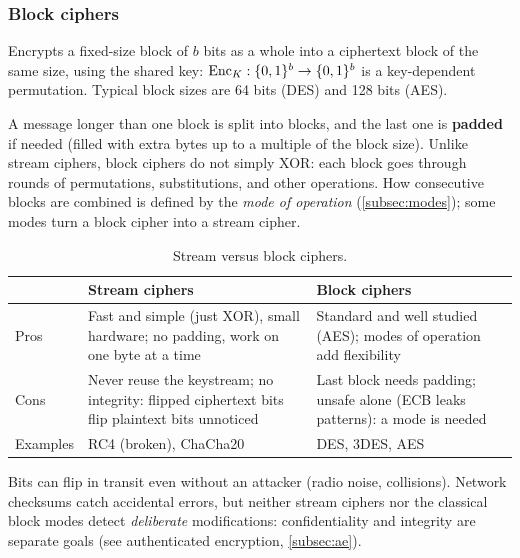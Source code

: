 \subsubsection{Block ciphers}

\begin{definition}
Encrypts a fixed-size block of $b$ bits as a whole into a ciphertext block of the same size, using the shared key: $\operatorname{Enc}_K : \{0,1\}^b \to \{0,1\}^b$ is a key-dependent permutation. Typical block sizes are 64 bits (DES) and 128 bits (AES).
\end{definition}

A message longer than one block is split into blocks, and the last one is \textbf{padded} if needed (filled with extra bytes up to a multiple of the block size). Unlike stream ciphers, block ciphers do not simply XOR: each block goes through rounds of permutations, substitutions, and other operations. How consecutive blocks are combined is defined by the \emph{mode of operation} (\cref{subsec:modes}); some modes turn a block cipher into a stream cipher.

\begin{table}[H]
\centering
\caption{Stream versus block ciphers.}
\label{tab:stream-vs-block}
\begin{tabularx}{\textwidth}{@{}l X X@{}}
\toprule
 & Stream ciphers & Block ciphers \\
\midrule
Pros & Fast and simple (just XOR), small hardware; no padding, work on one byte at a time & Standard and well studied (AES); modes of operation add flexibility \\
Cons & Never reuse the keystream; no integrity: flipped ciphertext bits flip plaintext bits unnoticed & Last block needs padding; unsafe alone (ECB leaks patterns): a mode is needed \\
Examples & RC4 (broken), ChaCha20 & DES, 3DES, AES \\
\bottomrule
\end{tabularx}
\end{table}

\begin{remark}
Bits can flip in transit even without an attacker (radio noise, collisions). Network checksums catch accidental errors, but neither stream ciphers nor the classical block modes detect \emph{deliberate} modifications: confidentiality and integrity are separate goals (see authenticated encryption, \cref{subsec:ae}).
\end{remark}

